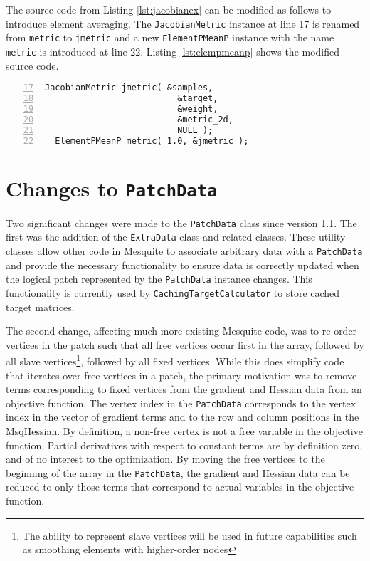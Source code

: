 \documentclass{article}
\begin{document}
The source code from Listing \ref{lst:jacobianex} can be modified as follows to introduce element averaging.  The \texttt{JacobianMetric} instance at line 17 is renamed from \texttt{metric} to \texttt{jmetric} and a new \texttt{ElementPMeanP} instance with the name \texttt{metric} is introduced at line 22.  Listing \ref{lst:elempmeanp} shows the modified source code.

\begin{lstlisting}[caption={Averaging Sample-Based Metrics Over Elements},label={lst:elempmeanp},numbers=left,firstnumber=17]
  JacobianMetric jmetric( &samples,
                          &target,
                          &weight,
                          &metric_2d,
                          NULL );
  ElementPMeanP metric( 1.0, &jmetric );
\end{lstlisting}


\appendix

\section{Changes to \texttt{PatchData}}

Two significant changes were made to the \texttt{PatchData} class since version 1.1.  The first was the addition of the \texttt{ExtraData} class and related classes.  These utility classes allow other code in Mesquite to associate arbitrary data with a \texttt{PatchData} and provide the necessary functionality to ensure data is correctly updated when the logical patch represented by the \texttt{PatchData} instance changes.  This functionality is currently used by \texttt{CachingTargetCalculator} to store cached target matrices.

The second change, affecting much more existing Mesquite code, was to re-order vertices in the patch such that all free vertices occur first in the array, followed by all slave vertices\footnote{The ability to represent slave vertices will be used in future capabilities such as smoothing elements with higher-order nodes}, followed by all fixed vertices.  While this does simplify code that iterates over free vertices in a patch, the primary motivation was to remove terms corresponding to fixed vertices from the gradient and Hessian data from an objective function.  The vertex index in the \texttt{PatchData} corresponds to the vertex index in the vector of gradient terms and to the row and column positions in the MsqHessian.  By definition, a non-free vertex is not a free variable in the objective function.  Partial derivatives with respect to constant terms are by definition zero, and of no interest to the optimization.  By moving the free vertices to the beginning of the array in the \texttt{PatchData}, the gradient and Hessian data can be reduced to only those terms that correspond to actual variables in the objective function.
\end{document}
